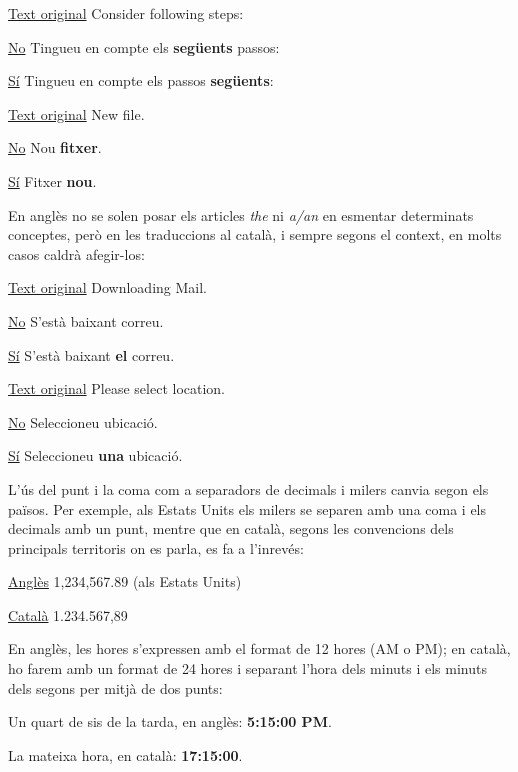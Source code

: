 \documentclass[9pt]{cheatsheet}
\begin{document}
\begin{multicols*}{3}
\underline {Text original} Consider following steps:

\underline {No} Tingueu en compte els \textbf{següents} passos:

\underline {Sí} Tingueu en compte els passos \textbf{següents}:


\underline {Text original} New file.

\underline {No} Nou \textbf{fitxer}.

\underline {Sí} Fitxer \textbf{nou}.


En anglès no se solen posar els articles \emph{the} ni \emph{a/an} en esmentar determinats conceptes, però en les traduccions al català, i sempre segons el context, en molts casos caldrà afegir-los:

\underline {Text original} Downloading Mail.

\underline {No} S'està baixant correu.

\underline {Sí} S'està baixant \textbf{el} correu.


\underline {Text original} Please select location.

\underline {No} Seleccioneu ubicació.

\underline {Sí} Seleccioneu \textbf{una} ubicació.




L'ús del punt i la coma com a separadors de decimals i milers canvia segon els països. Per exemple, als Estats Units els milers se separen amb una coma i els decimals amb un punt, mentre que en català, segons les convencions dels principals territoris on es parla, es fa a l'inrevés:

\underline {Anglès} 1,234,567.89 (als Estats Units)

\underline {Català} 1.234.567,89



En anglès, les hores s'expressen amb el format de 12 hores (AM o PM); en català, ho farem amb un format de 24 hores i separant l'hora dels minuts i els minuts dels segons per mitjà de dos punts:

Un quart de sis de la tarda, en anglès: \textbf{5:15:00 PM}.

La mateixa hora, en català: \textbf{17:15:00}.



\end{multicols*}
\end{document}
